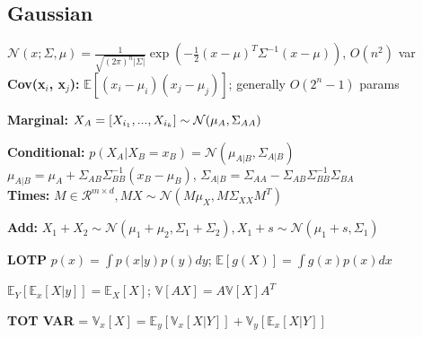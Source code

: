 \subsection{Gaussian}
$\mathcal{N}(x;\Sigma,\mu) = \frac{1}{\sqrt{(2\pi)^{n} |\Sigma|}} \exp(-\frac{1}{2}(x-\mu)^T \Sigma^{-1} (x-\mu))$, $O(n^2)$ var\\
\textbf{Cov(x$_i$, x$_j$):} $\mathbb{E}[(x_i-\mu_i)(x_j-\mu_j)]$;  generally $O(2^n -1)$ params \\
\begin{comment}
	The Gaussian is very important due to the ease of manipulation and the fact, that all distributions are driven towards a gaussian as stated in the central limit theorem.\\
	\textbf{Dimensionality:} For a usual distribution with n parameters, e.g. binary $P(X_1,..,X_n)$, we need $2^n-1$ variables. With a compositional Gaussian only $O(n^2)$.\\
	\textbf{Marginalization:} The cost of marginalisation is also huge with standart (binary distributions), need to sum up all combinations of other variables $O(2^{n-1)})$.\\
\end{comment}

\textbf{Marginal:} $X_A = [X_{i_1},...,X_{i_k}] \sim \mathcal{N}(\mu_A, \Sigma_{AA})$

\textbf{Conditional:} $p(X_A | X_B = x_B) = \mathcal{N}(\mu_{A|B}, \Sigma_{A|B})$\\ 
$\mu_{A|B} = \mu_A + \Sigma_{AB}\Sigma^{-1}_{BB}(x_B - \mu_B)$, $\Sigma_{A|B} = \Sigma_{AA} - \Sigma_{AB}\Sigma^{-1}_{BB} \Sigma_{BA}$\\

\textbf{Times:} $M \in \mathcal{R}^{m\times d}, MX \sim \mathcal{N}(M\mu_X, M\Sigma_{XX}M^T)$\\
\begin{comment}
	If we have a scalar instead of M, it reduces to $X_1s \sim \mathcal{N}(s\mu_1, s^2\Sigma_1)$\\
\end{comment}

\textbf{Add:} $X_1 + X_2 \sim \mathcal{N}(\mu_1 + \mu_2, \Sigma_1 + \Sigma_2), X_1+s \sim \mathcal{N}(\mu_1 + s, \Sigma_1)$

\textbf{LOTP} $p(x) = \int p(x | y) p(y) dy$; $\mathbb{E}[g(X)] = \int g(x) p(x) dx$

$\mathbb{E}_Y[\mathbb{E}_x[X|y]] = \mathbb{E}_X[X]$; $\mathbb{V}[AX] = A\mathbb{V}[X]A^T$

\textbf{TOT VAR} = $\mathbb{V}_x[X] = \mathbb{E}_y [\mathbb{V}_x [X|Y]] + \mathbb{V}_y [\mathbb{E}_x[X|Y]] $

